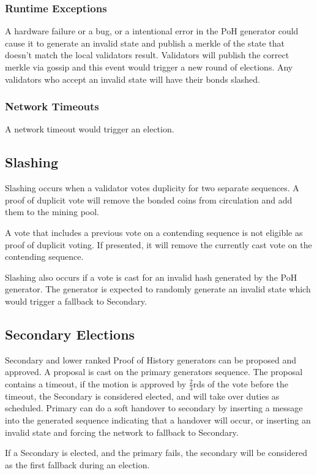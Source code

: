 \documentclass[12pt]{article}
\begin{document}
\subsubsection{Runtime Exceptions}
A hardware failure or a bug, or a intentional error in the PoH generator could cause it to generate an invalid state and publish a merkle of the state that doesn’t match the local validators result. Validators will publish the correct merkle via gossip and this event would trigger a new round of elections. Any validators who accept an invalid state will have their bonds slashed.

\subsubsection{Network Timeouts}

A network timeout would trigger an election.

\subsection{Slashing}
Slashing occurs when a validator votes duplicity for two separate sequences. A proof of duplicit vote will remove the bonded coins from circulation and add them to the mining pool.

A vote that includes a previous vote on a contending sequence is not eligible as proof of duplicit voting. If presented, it will remove the currently cast vote on the contending sequence.

Slashing also occurs if a vote is cast for an invalid hash generated by the PoH generator. The generator is expected to randomly generate an invalid state which would trigger a fallback to Secondary.
\subsection{Secondary Elections}
Secondary and lower ranked Proof of History generators can be proposed and approved. A proposal is cast on the primary generators sequence. The proposal contains a timeout, if the motion is approved by \(\frac{2}{3}\)rds of the vote before the timeout, the Secondary is considered elected, and will take over duties as scheduled. Primary can do a soft handover to secondary by inserting a message into the generated sequence indicating that a handover will occur, or inserting an invalid state and forcing the network to fallback to Secondary.

If a Secondary is elected, and the primary fails, the secondary will be considered as the first fallback during an election.
\end{document}
